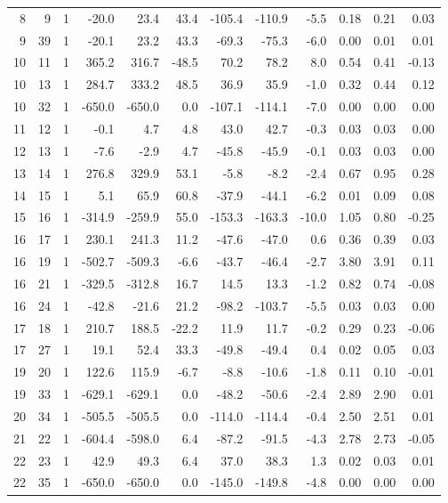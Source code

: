 \documentclass[12pt]{classe_uftex/uftex}
\begin{document}
\begin{landscape}
\begin{longtable}{rrcrrrrrrrrr}
8 & 9 & 1 & -20.0 & 23.4 & 43.4 & -105.4 & -110.9 & -5.5 & 0.18 & 0.21 & 0.03 \\
9 & 39 & 1 & -20.1 & 23.2 & 43.3 & -69.3 & -75.3 & -6.0 & 0.00 & 0.01 & 0.01 \\
10 & 11 & 1 & 365.2 & 316.7 & -48.5 & 70.2 & 78.2 & 8.0 & 0.54 & 0.41 & -0.13 \\
10 & 13 & 1 & 284.7 & 333.2 & 48.5 & 36.9 & 35.9 & -1.0 & 0.32 & 0.44 & 0.12 \\
10 & 32 & 1 & -650.0 & -650.0 & 0.0 & -107.1 & -114.1 & -7.0 & 0.00 & 0.00 & 0.00 \\
11 & 12 & 1 & -0.1 & 4.7 & 4.8 & 43.0 & 42.7 & -0.3 & 0.03 & 0.03 & 0.00 \\
12 & 13 & 1 & -7.6 & -2.9 & 4.7 & -45.8 & -45.9 & -0.1 & 0.03 & 0.03 & 0.00 \\
13 & 14 & 1 & 276.8 & 329.9 & 53.1 & -5.8 & -8.2 & -2.4 & 0.67 & 0.95 & 0.28 \\
14 & 15 & 1 & 5.1 & 65.9 & 60.8 & -37.9 & -44.1 & -6.2 & 0.01 & 0.09 & 0.08 \\
15 & 16 & 1 & -314.9 & -259.9 & 55.0 & -153.3 & -163.3 & -10.0 & 1.05 & 0.80 & -0.25 \\
16 & 17 & 1 & 230.1 & 241.3 & 11.2 & -47.6 & -47.0 & 0.6 & 0.36 & 0.39 & 0.03 \\
16 & 19 & 1 & -502.7 & -509.3 & -6.6 & -43.7 & -46.4 & -2.7 & 3.80 & 3.91 & 0.11 \\
16 & 21 & 1 & -329.5 & -312.8 & 16.7 & 14.5 & 13.3 & -1.2 & 0.82 & 0.74 & -0.08 \\
16 & 24 & 1 & -42.8 & -21.6 & 21.2 & -98.2 & -103.7 & -5.5 & 0.03 & 0.03 & 0.00 \\
17 & 18 & 1 & 210.7 & 188.5 & -22.2 & 11.9 & 11.7 & -0.2 & 0.29 & 0.23 & -0.06 \\
17 & 27 & 1 & 19.1 & 52.4 & 33.3 & -49.8 & -49.4 & 0.4 & 0.02 & 0.05 & 0.03 \\
19 & 20 & 1 & 122.6 & 115.9 & -6.7 & -8.8 & -10.6 & -1.8 & 0.11 & 0.10 & -0.01 \\
19 & 33 & 1 & -629.1 & -629.1 & 0.0 & -48.2 & -50.6 & -2.4 & 2.89 & 2.90 & 0.01 \\
20 & 34 & 1 & -505.5 & -505.5 & 0.0 & -114.0 & -114.4 & -0.4 & 2.50 & 2.51 & 0.01 \\
21 & 22 & 1 & -604.4 & -598.0 & 6.4 & -87.2 & -91.5 & -4.3 & 2.78 & 2.73 & -0.05 \\
22 & 23 & 1 & 42.9 & 49.3 & 6.4 & 37.0 & 38.3 & 1.3 & 0.02 & 0.03 & 0.01 \\
22 & 35 & 1 & -650.0 & -650.0 & 0.0 & -145.0 & -149.8 & -4.8 & 0.00 & 0.00 & 0.00 \\

\end{longtable}
\end{landscape}
\end{document}
